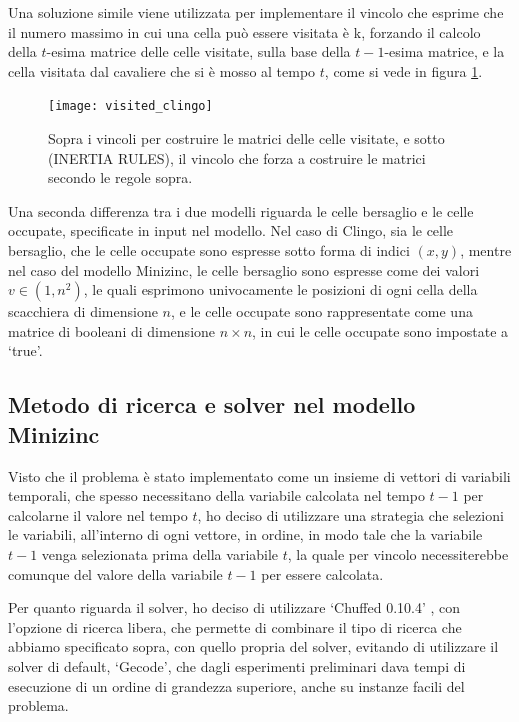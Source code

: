 \documentclass[12pt]{article}
\begin{document}
Una soluzione simile viene utilizzata per implementare il vincolo che esprime che il numero massimo in cui una cella può essere visitata è k, forzando il calcolo della $t$-esima matrice delle celle visitate, sulla base della $t-1$-esima matrice, e la cella visitata dal cavaliere che si è mosso al tempo $t$, come si vede in figura \ref{img:movements_A}.
\begin{figure}[H]
    \centering
    \texttt{[image: visited\_clingo]}
    \caption{Sopra i vincoli per costruire le matrici delle celle visitate, e sotto (INERTIA RULES), il vincolo che forza a costruire le matrici secondo le regole sopra.}
    \label{img:movements_A}
\end{figure}

Una seconda differenza tra i due modelli riguarda le celle bersaglio e le celle occupate, specificate in input nel modello. Nel caso di Clingo, sia le celle bersaglio, che le celle occupate sono espresse sotto forma di indici $(x,y)$, mentre nel caso del modello 
Minizinc, le celle bersaglio sono espresse come dei valori $v \in (1,n^2)$, le quali esprimono univocamente le posizioni di ogni cella della scacchiera di dimensione $n$, e le celle occupate sono rappresentate come una matrice di booleani di dimensione $n \times n$, in 
cui le celle occupate sono impostate a ‘true’.

\subsection{Metodo di ricerca e solver nel modello Minizinc}
Visto che il problema è stato implementato come un insieme di vettori di variabili temporali, che spesso necessitano della variabile calcolata nel tempo $t-1$ per calcolarne il valore nel tempo $t$, 
ho deciso di utilizzare una strategia che selezioni le variabili, all'interno di ogni vettore, in ordine, in modo tale che la variabile $t-1$ venga selezionata prima della variabile $t$, la quale per 
vincolo necessiterebbe comunque del valore della variabile $t-1$ per essere calcolata.

Per quanto riguarda il solver, ho deciso di utilizzare ‘Chuffed 0.10.4’ \cite{cit:solvers}, con l'opzione di ricerca libera, che permette di combinare il tipo di ricerca che abbiamo specificato sopra, con quello 
propria del solver, evitando di utilizzare il solver di default, ‘Gecode’, che dagli esperimenti preliminari dava tempi di esecuzione di un ordine di grandezza superiore, anche su instanze facili del problema.
\end{document}
